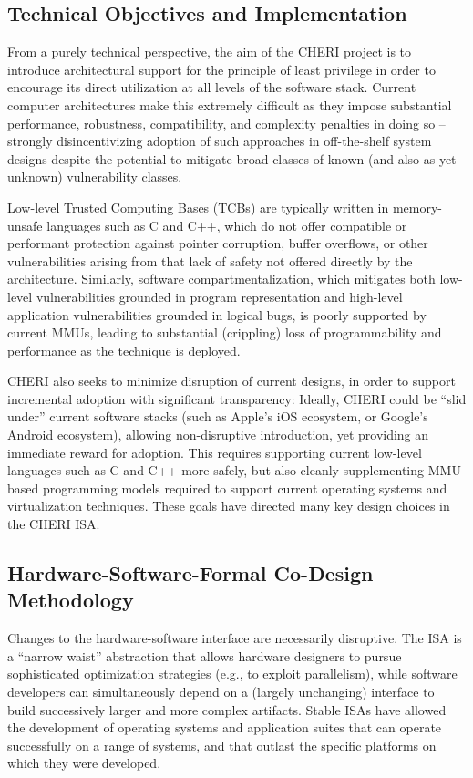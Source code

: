 \subsection{Technical Objectives and Implementation}

From a purely technical perspective, the aim of the CHERI project is to
introduce architectural support for the principle of least privilege in order
to encourage its direct utilization at all levels of the software stack.
Current computer architectures make this extremely difficult as they impose
substantial performance, robustness, compatibility, and complexity penalties
in doing so -- strongly disincentivizing adoption of such approaches in
off-the-shelf system designs despite the potential to mitigate broad classes
of known (and also as-yet unknown) vulnerability classes.

Low-level Trusted Computing Bases (TCBs) are typically written in
memory-unsafe languages such as C and C++, which do not offer compatible or
performant protection against pointer corruption, buffer overflows, or other
vulnerabilities arising from that lack of safety not offered directly by the
architecture.
Similarly, software compartmentalization, which mitigates both low-level
vulnerabilities grounded in program representation and high-level application
vulnerabilities grounded in logical bugs, is poorly supported by current MMUs,
leading to substantial (crippling) loss of programmability and performance as
the technique is deployed.

CHERI also seeks to minimize disruption of current designs, in order to
support incremental adoption with significant
transparency: Ideally, CHERI could be ``slid under'' current software stacks
(such as Apple's iOS ecosystem, or Google's Android ecosystem), allowing
non-disruptive introduction, yet providing an immediate reward for adoption.
This requires supporting current low-level languages such as C and C++ more
safely, but also cleanly supplementing MMU-based programming models required
to support current operating systems and virtualization techniques.
These goals have directed many key design choices in the CHERI ISA.

\subsection{Hardware-Software-Formal Co-Design Methodology}

Changes to the hardware-software interface are necessarily disruptive.
The ISA is a ``narrow waist'' abstraction that allows hardware designers to
pursue sophisticated optimization strategies (e.g., to exploit parallelism),
while software developers can simultaneously depend on a (largely unchanging)
interface to build successively larger and more complex artifacts.
Stable ISAs have allowed the development of operating systems and application
suites that can operate successfully on a range of systems, and that outlast
the specific platforms on which they were developed.

